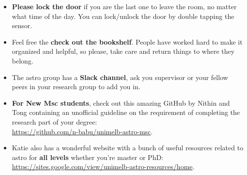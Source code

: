 \documentclass[11pt, oneside, a4paper]{article}
\newcommand{\tipscolor}{ForestGreen}
\begin{document}
\begin{tcolorbox}[colback=\tipscolor!5!white,colframe=\tipscolor!50!white,title={Tips \& Reminders}]
    \begin{itemize}
        \item \textbf{Please lock the door} if you are the last one to leave the room, no matter what time of the day. You can lock/unlock the door by double tapping the sensor.
        \item Feel free the \textbf{check out the bookshelf}. People have worked hard to make it organized and helpful, so please, take care and return things to where they belong.
        \item The astro group has a \textbf{Slack channel}, ask you supervisor or your fellow peers in your research group to add you in.
        \item \textbf{For New Msc students}, check out this amazing GitHub by Nithin and Tong containing an unofficial guideline on the requirement of completing the research part of your degree:
        \\
        \url{https://github.com/n-babu/unimelb-astro-msc}.
        \item Katie also has a wonderful website with a bunch of useful resources related to astro for \textbf{all levels} whether you're master or PhD: 
        \\
        \url{https://sites.google.com/view/unimelb-astro-resources/home}.
        \end{itemize}
\end{tcolorbox} 
\end{document}
